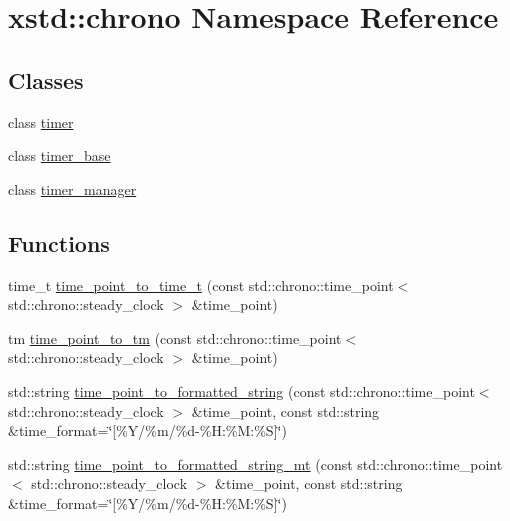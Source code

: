 \hypertarget{namespacexstd_1_1chrono}{\section{xstd\-:\-:chrono Namespace Reference}
\label{namespacexstd_1_1chrono}
}
\subsection*{Classes}
\begin{DoxyCompactItemize}
\item 
class \hyperlink{classxstd_1_1chrono_1_1timer}{timer}
\item 
class \hyperlink{classxstd_1_1chrono_1_1timer__base}{timer\-\_\-base}
\item 
class \hyperlink{classxstd_1_1chrono_1_1timer__manager}{timer\-\_\-manager}
\end{DoxyCompactItemize}
\subsection*{Functions}
\begin{DoxyCompactItemize}
\item 
time\-\_\-t \hyperlink{namespacexstd_1_1chrono_af3f86d799ca227d2bf0ac8ff5a08df3b}{time\-\_\-point\-\_\-to\-\_\-time\-\_\-t} (const std\-::chrono\-::time\-\_\-point$<$ std\-::chrono\-::steady\-\_\-clock $>$ \&time\-\_\-point)
\item 
tm \hyperlink{namespacexstd_1_1chrono_a1f31cb15f2e74489fc0f98fa38758067}{time\-\_\-point\-\_\-to\-\_\-tm} (const std\-::chrono\-::time\-\_\-point$<$ std\-::chrono\-::steady\-\_\-clock $>$ \&time\-\_\-point)
\item 
std\-::string \hyperlink{namespacexstd_1_1chrono_a5fd95ee0963d407c39528b3f48790842}{time\-\_\-point\-\_\-to\-\_\-formatted\-\_\-string} (const std\-::chrono\-::time\-\_\-point$<$ std\-::chrono\-::steady\-\_\-clock $>$ \&time\-\_\-point, const std\-::string \&time\-\_\-format=\char`\"{}\mbox{[}\%Y/\%m/\%d-\/\%H\-:\%M\-:\%S\mbox{]}\char`\"{})
\item 
std\-::string \hyperlink{namespacexstd_1_1chrono_a07cd40fda33f294f91510fe6895ce6c7}{time\-\_\-point\-\_\-to\-\_\-formatted\-\_\-string\-\_\-mt} (const std\-::chrono\-::time\-\_\-point$<$ std\-::chrono\-::steady\-\_\-clock $>$ \&time\-\_\-point, const std\-::string \&time\-\_\-format=\char`\"{}\mbox{[}\%Y/\%m/\%d-\/\%H\-:\%M\-:\%S\mbox{]}\char`\"{})
\end{DoxyCompactItemize}


